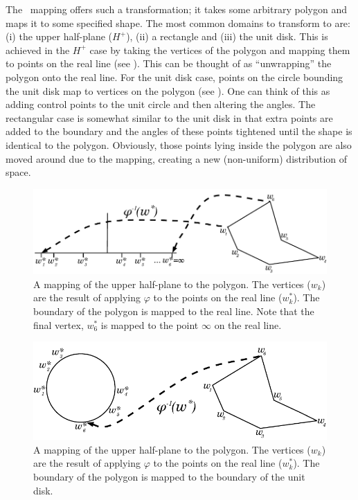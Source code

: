 The \sch\ mapping offers such a transformation; it takes some arbitrary polygon and maps it to some specified shape. The most common domains to transform to are: (i) the upper half-plane ($H^+$), (ii) a rectangle and (iii) the unit disk. This is achieved in the $H^+$ case by taking the vertices of the polygon and mapping them to points on the real line (see ). This can be thought of as ``unwrapping'' the polygon onto the real line. For the unit disk case, points on the circle bounding the unit disk map to vertices on the polygon (see ). One can think of this as adding control points to the unit circle and then altering the angles. The rectangular case is somewhat similar to the unit disk in that extra points are added to the boundary and the angles of these points tightened until the shape is identical to the polygon. Obviously, those points lying inside the polygon are also moved around due to the mapping, creating a new (non-uniform) distribution of space.

\begin{figure} [tbp]
\centering
\includegraphics[scale=0.6]{sc/figs/reallinedia.pdf}
\caption{A mapping of the upper half-plane to the polygon. The vertices ($w_k$) are the result of applying $\varphi$ to the points on the real line ($w^*_k$). The boundary of the polygon is mapped to the real line. Note that the final vertex, $w^*_6$ is mapped to the point $\infty$ on the real line.}
\label{reallinedia}
\end{figure}

\begin{figure} [tbp]
\centering
\includegraphics[scale=0.6]{sc/figs/unitdiskdia.pdf}
\caption{A mapping of the upper half-plane to the polygon. The vertices ($w_k$) are the result of applying $\varphi$ to the points on the real line ($w^*_k$). The boundary of the polygon is mapped to the boundary of the unit disk.}
\label{unitdiskdia}
\end{figure}

